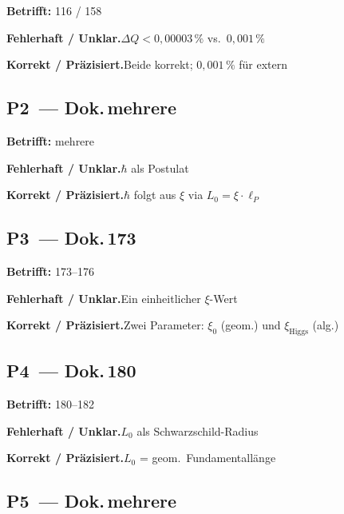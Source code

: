 \noindent\textbf{Betrifft:} 116 / 158


\smallskip\noindent\textbf{Fehlerhaft / Unklar.}\quad $\Delta Q < 0{,}00003\,\%$ vs.\ $0{,}001\,\%$


\smallskip\noindent\textbf{Korrekt / Präzisiert.}\quad Beide korrekt; $0{,}001\,\%$ für extern


\medskip


\subsection*{P2~--- Dok.\,mehrere}

\noindent\textbf{Betrifft:} mehrere


\smallskip\noindent\textbf{Fehlerhaft / Unklar.}\quad $\hbar$ als Postulat


\smallskip\noindent\textbf{Korrekt / Präzisiert.}\quad $\hbar$ folgt aus $\xi$ via $L_0 = \xi\cdot\ell_P$


\medskip


\subsection*{P3~--- Dok.\,173}

\noindent\textbf{Betrifft:} 173--176


\smallskip\noindent\textbf{Fehlerhaft / Unklar.}\quad Ein einheitlicher $\xi$-Wert


\smallskip\noindent\textbf{Korrekt / Präzisiert.}\quad Zwei Parameter: $\xi_0$ (geom.) und $\xi_{\text{Higgs}}$ (alg.)


\medskip


\subsection*{P4~--- Dok.\,180}

\noindent\textbf{Betrifft:} 180--182


\smallskip\noindent\textbf{Fehlerhaft / Unklar.}\quad $L_0$ als Schwarzschild-Radius


\smallskip\noindent\textbf{Korrekt / Präzisiert.}\quad $L_0$ = geom.\ Fundamentallänge


\medskip


\subsection*{P5~--- Dok.\,mehrere}

